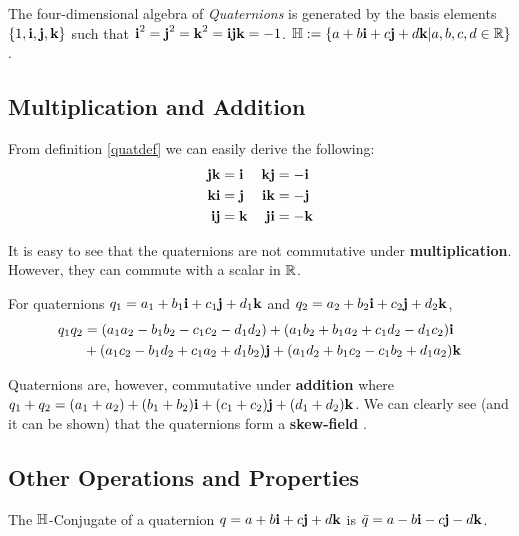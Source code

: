 \begin{definition}[Quaternion] \label{quatdef}
	The four-dimensional algebra of \emph{Quaternions} is generated by the basis elements $\{1,\textbf{i},\textbf{j},\textbf{k}\}$ such that $\textbf{i}^2 = \textbf{j}^2 = \textbf{k}^2 = \textbf{i} \textbf{j} \textbf{k} = -1$. $\operatorname{\mathbb{H}} := \{a + b\textbf{i} + c\textbf{j} + d\textbf{k} | a,b,c,d \in \operatorname{\mathbb{R}}\}$. \cite{stamaria}
\end{definition}

\subsection{Multiplication and Addition}

From definition \ref{quatdef} we can easily derive the following:
\begin{align*}
	\textbf{j}\textbf{k} &= \textbf{i} & \textbf{k}\textbf{j} &= -\textbf{i} \\
	\textbf{k}\textbf{i} &= \textbf{j} & \textbf{i}\textbf{k} &= -\textbf{j} \\
	\textbf{i}\textbf{j} &= \textbf{k} & \textbf{j}\textbf{i} &= -\textbf{k}
\end{align*}

It is easy to see that the quaternions are not commutative under \textbf{multiplication}. However, they can commute with a scalar in $\operatorname{\mathbb{R}}$.

\begin{theorem} \label{quatx}
	For quaternions $q_1 = a_1 + b_1\textbf{i} + c_1\textbf{j} + d_1\textbf{k}$ and $q_2 = a_2 + b_2\textbf{i} + c_2\textbf{j} + d_2\textbf{k}$, 
	\begin{align*}
		q_1q_2 &= (a_1a_2 - b_1b_2 - c_1c_2 - d_1d_2) + (a_1b_2 + b_1a_2 + c_1d_2 - d_1c_2)\textbf{i} \\
			   &+ (a_1c_2 - b_1d_2 + c_1a_2 + d_1b_2)\textbf{j} + (a_1d_2 + b_1c_2 - c_1b_2 + d_1a_2)\textbf{k}
	\end{align*}
\end{theorem}

Quaternions are, however, commutative under \textbf{addition} where $q_1+q_2 = (a_1+a_2) + (b_1+b_2)\textbf{i} + (c_1+c_2)\textbf{j} + (d_1+d_2)\textbf{k}$. We can clearly see (and it can be shown) that the quaternions form a \textbf{skew-field} \cite{aslaksen} \cite{brenner}. 

\subsection{Other Operations and Properties}

\begin{definition}[$\HH$-Conjugate] \label{hconj}
	The $\HH$-Conjugate of a quaternion $q = a + b\textbf{i} + c\textbf{j} + d\textbf{k}$ is $\bar{q} = a - b\textbf{i} - c\textbf{j} - d\textbf{k}$.
\end{definition}

